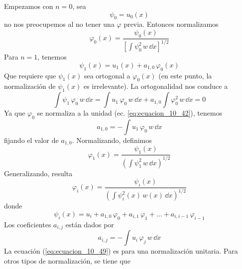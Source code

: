 Empezamos con $n = 0$, sea
\begin{equation}
\psi_{0} = u_{0}(x)
\label{eq:ecuacion_10_41}
\end{equation}
no nos preocupemos al no tener una $\varphi$ previa. Entonces normalizamos
\begin{equation}
\varphi_{0}(x) = \dfrac{\psi_{0}(x)}{\left[ \displaystyle \int \psi_{0}^{2} \, w \, \dd{x} \right]^{1/2}}
\label{eq:ecuacion_10_42}
\end{equation}
Para $n = 1$, tenemos
\begin{equation}
\psi_{1}(x) = u_{1}(x) + a_{1,0} \, \varphi_{0}(x)
\label{eq:ecuacion_10_43}
\end{equation}
Que requiere que $\psi_{1}(x)$ sea ortogonal a $\varphi_{0}(x)$ (en este punto, la normalización de $\psi_{1}(x)$ es irrelevante). La ortogonalidad nos conduce a
\begin{equation}
\int \psi_{1} \, \varphi_{0} \, w \, \dd{x} = \int u_{1} \, \varphi_{0} \, w \, \dd{x} + a_{1,0} \int \varphi_{0}^{2} \, w \,  \dd{x} = 0
\label{eq:ecuacion_10_44}
\end{equation}
Ya que $\varphi_{0}$ se normaliza a la unidad (ec. \ref{eq:ecuacion_10_42}), tenemos
\begin{equation}
a_{1,0} = - \int u_{1} \, \varphi_{0} \, w \, \dd{x}
\label{eq:ecuacion_10_45}
\end{equation}
fijando el valor de $a_{1, 0}$. Normalizando, definimos
\begin{equation}
\varphi_{1} (x) = \dfrac{\psi_{1}(x)}{\left( \displaystyle \int \psi_{1}^{2} \, w \, \dd{x} \right)^{1/2}}
\label{eq:ecuacion_10_46}
\end{equation}
Generalizando, resulta
\begin{equation}
\varphi_{i}(x) = \dfrac{\psi_{i}(x)}{\left( \displaystyle \int \psi_{i}^{2}(x) \, w(x) \, \dd{x} \right)^{1/2}}
\label{eq:ecuacion_10_47}
\end{equation}
donde
\begin{equation}
\psi_{i}(x) = u_{i} + a_{1, 0} \, \varphi_{0} + a_{i, 1} \, \varphi_{1} + \ldots + a_{i, i-1} \, \varphi_{i-1}
\label{eq:ecuacion_10_48}
\end{equation}
Los coeficientes $a_{i, j}$ están dados por
\begin{equation}
a_{i, j} = - \int u_{i} \, \varphi_{j} \, w \, \dd{x}
\label{eq:ecuacion_10_49}
\end{equation}
La ecuación (\ref{eq:ecuacion_10_49}) es para una normalización unitaria. Para otros tipos de normalización, se tiene que
